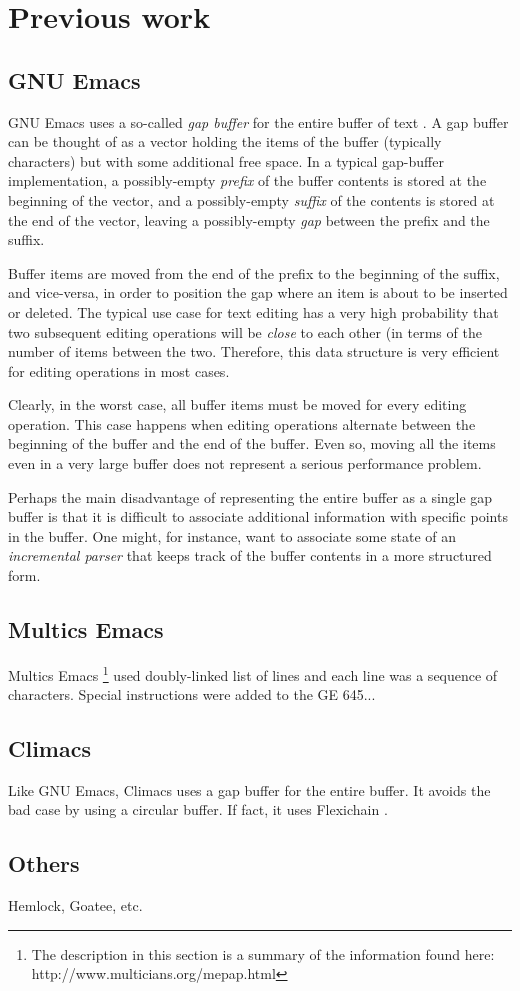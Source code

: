 \section{Previous work}

\subsection{GNU Emacs}

GNU Emacs uses a so-called \emph{gap buffer} for the entire buffer of
text \cite{GNUEmacsLispReferenceManual} \cite{CraftOfTextEditiing}.  A
gap buffer can be thought of as a vector holding the items of the
buffer (typically characters) but with some additional free space.  In
a typical gap-buffer implementation, a possibly-empty \emph{prefix} of
the buffer contents is stored at the beginning of the vector, and a
possibly-empty \emph{suffix} of the contents is stored at the end of
the vector, leaving a possibly-empty \emph{gap} between the prefix and
the suffix.

Buffer items are moved from the end of the prefix to the beginning of
the suffix, and vice-versa, in order to position the gap where an item
is about to be inserted or deleted.  The typical use case for text
editing has a very high probability that two subsequent editing
operations will be \emph{close} to each other (in terms of the number
of items between the two.  Therefore, this data structure is very
efficient for editing operations in most cases.

Clearly, in the worst case, all buffer items must be moved for every
editing operation.  This case happens when editing operations
alternate between the beginning of the buffer and the end of the
buffer.  Even so, moving all the items even in a very large buffer
does not represent a serious performance problem.

Perhaps the main disadvantage of representing the entire buffer as a
single gap buffer is that it is difficult to associate additional
information with specific points in the buffer.  One might, for
instance, want to associate some state of an \emph{incremental parser}
that keeps track of the buffer contents in a more structured form.

\subsection{Multics Emacs}


Multics Emacs%
\footnote{The description in this section is a summary of the
  information found here: http://www.multicians.org/mepap.html}
used doubly-linked list of lines and each line was a
sequence of characters.  Special instructions were added to the GE
645...

\subsection{Climacs}

Like GNU Emacs, Climacs uses a gap buffer for the entire buffer.  It
avoids the bad case by using a circular buffer.  If fact, it uses
Flexichain \cite{flexichain}.

\subsection{Others}

Hemlock, Goatee, etc.

